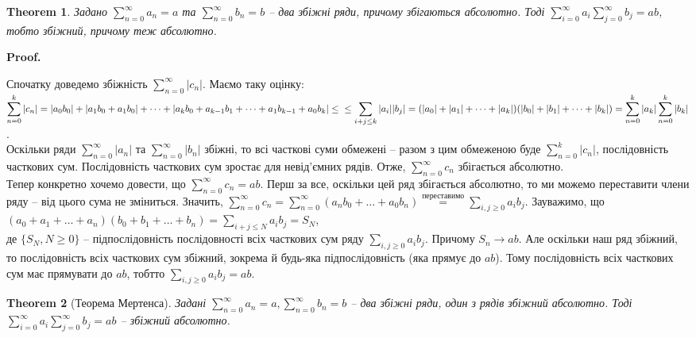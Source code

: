 \documentclass[a4paper, 10pt]{article}
\makeatletter
\def\qed{$\blacksquare$}
\theoremstyle{theoremdd}
\newtheorem{theorem}{Theorem}[subsection]
\theoremstyle{theoremdd}
\theoremstyle{theoremdd}
\theoremstyle{theoremdd}
\theoremstyle{theoremdd}
\theoremstyle{theoremdd}
\theoremstyle{theoremdd}
\theoremstyle{theoremdd}
\theoremstyle{theoremdd}
\renewenvironment{proof}[1][Proof.\\]{\par
\pushQED{\hfill \qed}%
\normalfont \topsep6\p@\@plus6\p@\relax
\trivlist
\item\relax
{\bfseries
#1\@addpunct{.}}\hspace\labelsep\ignorespaces
}{%
\popQED\endtrivlist\@endpefalse
}
\makeatother
\begin{document}
\begin{theorem}
Задано $\displaystyle\sum_{n=0}^\infty a_n = a$ та $\displaystyle\sum_{n=0}^\infty b_n = b$ -- два збіжні ряди, причому збігаються абсолютно. Тоді $\displaystyle\sum_{i=0}^\infty a_i \sum_{j=0}^\infty b_j = ab$, тобто збіжний, причому теж абсолютно.
\end{theorem}

\begin{proof}
Спочатку доведемо збіжність $\displaystyle\sum_{n=0}^\infty |c_n|$. Маємо таку оцінку:\\
$\displaystyle\sum_{n=0}^k |c_n| = |a_0 b_0| + |a_1 b_0 + a_1 b_0| + \dots + |a_k b_0 + a_{k-1} b_1 + \dots + a_1 b_{k-1} + a_0 b_k| \leq \\
\leq \displaystyle\sum_{i+j \leq k} |a_i| |b_j| = (|a_0| + |a_1| + \dots + |a_k|) (|b_0| + |b_1| + \dots + |b_k|) = \sum_{n=0}^k |a_k| \sum_{n=0}^k |b_k|$.\\
Оскільки ряди $\displaystyle\sum_{n=0}^\infty |a_n|$ та $\displaystyle\sum_{n=0}^\infty |b_n|$ збіжні, то всі часткові суми обмежені -- разом з цим обмеженою буде $\displaystyle\sum_{n=0}^k |c_n|$, послідовність часткових сум. Послідовність часткових сум зростає для невід'ємних рядів. Отже, $\displaystyle\sum_{n=0}^\infty c_n$ збігається абсолютно.\\
Тепер конкретно хочемо довести, що $\displaystyle\sum_{n=0}^\infty c_n = ab$. Перш за все, оскільки цей ряд збігається абсолютно, то ми можемо переставити члени ряду -- від цього сума не зміниться. Значить, $\displaystyle\sum_{n=0}^\infty c_n = \sum_{n=0}^\infty (a_n b_0 + \dots + a_0 b_n) \overset{\text{переставимо}}{=} \sum_{i,j \geq 0} a_i b_j$. Зауважимо, що\\
$(a_0 + a_1 + \dots + a_n)(b_0 + b_1 + \dots + b_n) = \displaystyle\sum_{i+j \leq N} a_i b_j = S_N$,\\
де $\{S_N, N \geq 0\}$ -- підпослідовність послідовності всіх часткових сум ряду $\displaystyle\sum_{i,j \geq 0} a_i b_j$. Причому $S_n \to ab$. Але оскільки наш ряд збіжний, то послідовність всіх часткових сум збіжний, зокрема й будь-яка підпослідовність (яка прямує до $ab$). Тому послідовність всіх часткових сум має прямувати до $ab$, тобтто $\displaystyle\sum_{i,j \geq 0} a_ib_j = ab$.
\end{proof}

\begin{theorem}[Теорема Мертенса]
Задані $\displaystyle\sum_{n=0}^\infty a_n = a, \sum_{n=0}^\infty b_n = b$ -- два збіжні ряди, один з рядів збіжний абсолютно. Тоді $\displaystyle\sum_{i=0}^\infty a_i \sum_{j=0}^\infty b_j = ab$ -- збіжний абсолютно.
\end{theorem}
\end{document}
